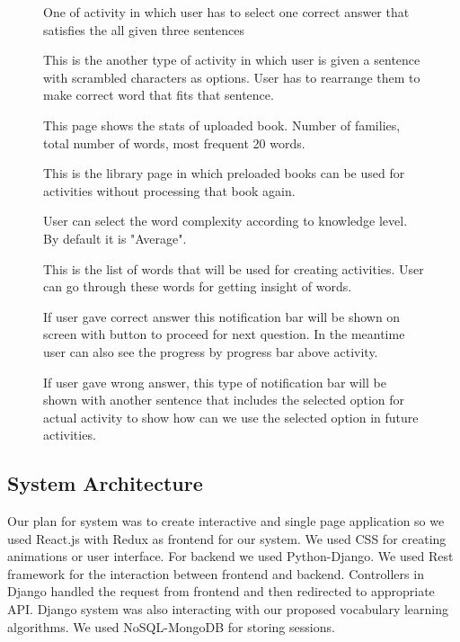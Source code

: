 \documentclass[11pt,a4paper]{article}
\begin{document}
\begin{figure}
\begin{tcbraster}[raster columns=1, enhanced, blankest]
\caption{One of activity in which user has to select one correct answer that satisfies the all given three sentences}

\caption{This is the another type of activity in which user is given a sentence with scrambled characters as options. User has to rearrange them to make correct word that fits that sentence.}

\caption{This page shows the stats of uploaded book. Number of families, total number of words, most frequent 20 words.}


\caption{This is the library page in which preloaded books can be used for activities without processing that book again.}

\end{tcbraster}
\end{figure}




\begin{figure}
\begin{tcbraster}[raster columns=1, enhanced, blankest]
\caption{User can select the word complexity according to knowledge level. By default it is "Average".}


\caption{This is the list of words that will be used for creating activities. User can go through these words for getting insight of words.}

\caption{If user gave correct answer this notification bar will be shown on screen with button to proceed for next question. In the meantime user can also see the progress by progress bar above activity.}

\caption{If user gave wrong answer, this type of notification bar will be shown with another sentence that includes the selected option for actual activity to show how can we use the selected option in future activities.}
\end{tcbraster}
\end{figure}




\subsection{System Architecture}
Our plan for system was to create interactive and single page application so we used React.js with Redux as frontend for our system. We used CSS for creating animations or user interface. For backend we used Python-Django. We used Rest framework for the interaction between frontend and backend. Controllers in Django handled the request from frontend and then redirected to appropriate API. Django system was also interacting with our proposed vocabulary learning algorithms. We used NoSQL-MongoDB for storing sessions.   
\end{document}
